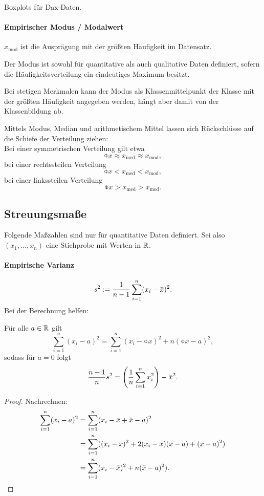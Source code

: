 \begin{exmp}%
  Boxplots für Dax-Daten.
\end{exmp}

\paragraph{Empirischer Modus / Modalwert}
$x_{\mathrm{mod}}$ ist die Ausprägung mit der größten Häufigkeit im Datensatz.

Der Modus ist sowohl für quantitative als auch qualitative Daten definiert,
sofern die Häufigkeitsverteilung ein eindeutiges Maximum besitzt.

Bei stetigen Merkmalen kann der Modus als Klassenmittelpunkt der Klasse mit der
größten Häufigkeit angegeben werden, hängt aber damit von der Klassenbildung ab.

Mittels Modus, Median und arithmetischem Mittel lassen sich Rückschlüsse auf die
Schiefe der Verteilung ziehen:\\
Bei einer symmetrischen Verteilung gilt etwa
\[ \obar{x} \approx x_{\mathrm{med}} \approx x_{\mathrm{mod}}, \]
bei einer rechtssteilen Verteilung
\[ \obar{x} < x_{\mathrm{med}} < x_{\mathrm{mod}}, \]
bei einer linkssteilen Verteilung
\[ \obar{x} > x_{\mathrm{med}} > x_{\mathrm{mod}}. \]

\subsection{Streuungsmaße}
Folgende Maßzahlen sind nur für quantitative Daten definiert. Sei also $(x_1,
\ldots, x_n)$ eine Stichprobe mit Werten in $\mathbb{R}$.

\paragraph{Empirische Varianz}
\[ s^2 := \rez{n-1} \sum_{i=1}^n (x_i - \obar{x})^2. \]
Bei der Berechnung helfen:
\begin{lem}[Verschiebungssatz] \label{lem:verschiebung} %
  Für alle $a \in \mathbb{R}$ gilt
  \[ \sum_{i=1}^n (x_i - a)^2 = \sum_{i=1}^n (x_i - \obar{x})^2 + n(\obar{x} -
    a)^2, \]
  sodass für $a = 0$ folgt
  \[ \frac{n-1}{n} s^2 = \left( \rez{n} \sum_{i=1}^n x_i^2 \right) - \obar{x}^2. \]
\end{lem}

\begin{proof}
  Nachrechnen:
  \begin{align*}
    \sum_{i=1}^n (x_i - a)^2
    &= \sum_{i=1}^n (x_i - \obar{x} + \obar{x} - a)^2 \\
    &= \sum_{i=1}^n ((x_i - \obar{x})^2
      + 2(x_i-\obar{x})(\obar{x}-a) + (\obar{x}-a)^2) \\
    &= \sum_{i=1}^n (x_i - \obar{x})^2 + n(\obar{x}-a)^2). \qedhere
  \end{align*}
\end{proof}

